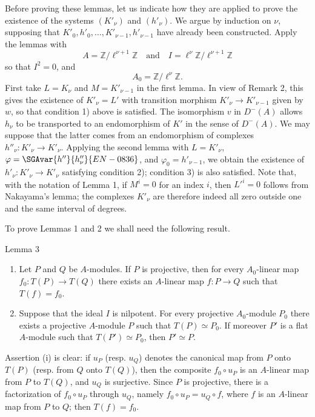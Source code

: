 Before proving these lemmas, let us indicate how they are applied to prove the existence of the systems $(K'_\nu)$ and $(h'_\nu)$. We argue by induction on $\nu$, supposing that $K'_0,h'_0,\ldots,K'_{\nu-1},h'_{\nu-1}$ have already been constructed. Apply the lemmas with
\[
A=\mathbb Z/\ell^{\nu+1}\mathbb Z
\quad\text{and}\quad
I=\ell^\nu\mathbb Z/\ell^{\nu+1}\mathbb Z
\]
so that $I^2=0$, and
\[
A_0=\mathbb Z/\ell^\nu\mathbb Z.
\]
First take $L=K_\nu$ and $M=K'_{\nu-1}$ in the first lemma. In view of Remark 2, this gives the existence of $K'_\nu=L'$ with transition morphism $K'_\nu\to K'_{\nu-1}$ given by $w$, so that condition 1) above is satisfied. The isomorphism $v$ in $D^-(A)$ allows $h_\nu$ to be transported to an endomorphism of $K'$ in the sense of $D^-(A)$. We may suppose that the latter comes from an endomorphism of complexes $h''_\nu:K'_\nu\to K'_\nu$. Applying the second lemma with $L=K'_\nu$, $\varphi=\SGAvar{h''}{h''_\nu}{EN-0836}$, and $\varphi_0=h'_{\nu-1}$, we obtain the existence of $h'_\nu:K'_\nu\to K'_\nu$ satisfying condition 2); condition 3) is also satisfied. Note that, with the notation of Lemma 1, if $M^i=0$ for an index $i$, then $L'^i=0$ follows from Nakayama's lemma; the complexes $K'_\nu$ are therefore indeed all zero outside one and the same interval of degrees.

To prove Lemmas 1 and 2 we shall need the following result.

\begin{statement}{Lemma 3}
\begin{enumerate}[label=(\roman*)]
\item Let $P$ and $Q$ be $A$-modules. If $P$ is projective, then for every $A_0$-linear map $f_0:T(P)\to T(Q)$ there exists an $A$-linear map $f:P\to Q$ such that $T(f)=f_0$.
\item Suppose that the ideal $I$ is nilpotent. For every projective $A_0$-module $P_0$ there exists a projective $A$-module $P$ such that $T(P)\simeq P_0$. If moreover $P'$ is a flat $A$-module such that $T(P')\simeq P_0$, then $P'\simeq P$.
\end{enumerate}
\end{statement}

Assertion (i) is clear: if $u_P$ (resp. $u_Q$) denotes the canonical map from $P$ onto $T(P)$ (resp. from $Q$ onto $T(Q)$), then the composite $f_0\circ u_P$ is an $A$-linear map from $P$ to $T(Q)$, and $u_Q$ is surjective. Since $P$ is projective, there is a factorization of $f_0\circ u_P$ through $u_Q$, namely $f_0\circ u_P=u_Q\circ f$, where $f$ is an $A$-linear map from $P$ to $Q$; then $T(f)=f_0$.

